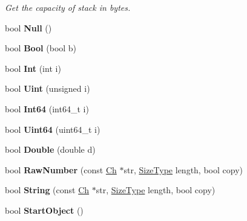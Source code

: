 \begin{DoxyCompactItemize}
\begin{DoxyCompactList}\small\item\em Get the capacity of stack in bytes. \end{DoxyCompactList}\item 
bool {\bfseries Null} ()\hypertarget{a00115_a87dc7f66b2b92660b8a43546733f9df2}{}\label{a00115_a87dc7f66b2b92660b8a43546733f9df2}

\item 
bool {\bfseries Bool} (bool b)\hypertarget{a00115_a4c44780642518dd34bd241a1ea0ceaf1}{}\label{a00115_a4c44780642518dd34bd241a1ea0ceaf1}

\item 
bool {\bfseries Int} (int i)\hypertarget{a00115_a8cc986266becaa268474c607489745c7}{}\label{a00115_a8cc986266becaa268474c607489745c7}

\item 
bool {\bfseries Uint} (unsigned i)\hypertarget{a00115_a530dd899a04a00ba74f52507b488d2c1}{}\label{a00115_a530dd899a04a00ba74f52507b488d2c1}

\item 
bool {\bfseries Int64} (int64\+\_\+t i)\hypertarget{a00115_a934b1b7a7ed89917615a5410db77a942}{}\label{a00115_a934b1b7a7ed89917615a5410db77a942}

\item 
bool {\bfseries Uint64} (uint64\+\_\+t i)\hypertarget{a00115_a50ac3451a1afd0ce248dcc023d5e09e8}{}\label{a00115_a50ac3451a1afd0ce248dcc023d5e09e8}

\item 
bool {\bfseries Double} (double d)\hypertarget{a00115_a934bf7a5d1ff062ab079756d842e4f6b}{}\label{a00115_a934bf7a5d1ff062ab079756d842e4f6b}

\item 
bool {\bfseries Raw\+Number} (const \hyperlink{a00130_ade0e0ce64ccd5d852da57a35e720bafb}{Ch} $\ast$str, \hyperlink{a00677_a5ed6e6e67250fadbd041127e6386dcb5}{Size\+Type} length, bool copy)\hypertarget{a00115_af703994dec5af6ef049a24b5243aceab}{}\label{a00115_af703994dec5af6ef049a24b5243aceab}

\item 
bool {\bfseries String} (const \hyperlink{a00130_ade0e0ce64ccd5d852da57a35e720bafb}{Ch} $\ast$str, \hyperlink{a00677_a5ed6e6e67250fadbd041127e6386dcb5}{Size\+Type} length, bool copy)\hypertarget{a00115_ad319fcc9e13606b6795424b9374a7398}{}\label{a00115_ad319fcc9e13606b6795424b9374a7398}

\item 
bool {\bfseries Start\+Object} ()\hypertarget{a00115_abb1417fde52cc34cb340e3b50a3295da}{}\label{a00115_abb1417fde52cc34cb340e3b50a3295da}


\end{DoxyCompactItemize}
